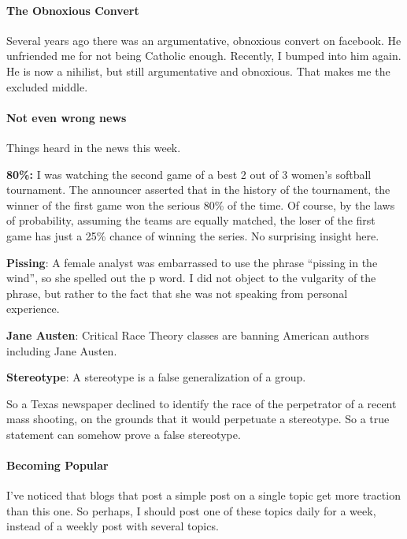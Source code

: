 \paragraph{The Obnoxious Convert}


Several years ago there was an argumentative, obnoxious convert on facebook. He unfriended me for not being Catholic enough. Recently, I bumped into him again. He is now a nihilist, but still argumentative and obnoxious. That makes me the excluded middle.

\paragraph{Not even wrong news}


Things heard in the news this week.

\textbf{80\%:} I was watching the second game of a best 2 out of 3 women's softball tournament. The announcer asserted that in the history of the tournament, the winner of the first game won the serious 80\% of the time. Of course, by the laws of probability, assuming the teams are equally matched, the loser of the first game has just a 25\% chance of winning the series. No surprising insight here.

\textbf{Pissing}: A female analyst was embarrassed to use the phrase ``pissing in the wind'', so she spelled out the p word. I did not object to the vulgarity of the phrase, but rather to the fact that she was not speaking from personal experience.

\textbf{Jane Austen}: Critical Race Theory classes are banning American authors including Jane Austen.

\textbf{Stereotype}: A stereotype is a false generalization of a group.

So a Texas newspaper declined to identify the race of the perpetrator of a recent mass shooting, on the grounds that it would perpetuate a stereotype. So a true statement can somehow prove a false stereotype.

\paragraph{Becoming Popular}


I've noticed that blogs that post a simple post on a single topic get more traction than this one. So perhaps, I should post one of these topics daily for a week, instead of a weekly post with several topics.


